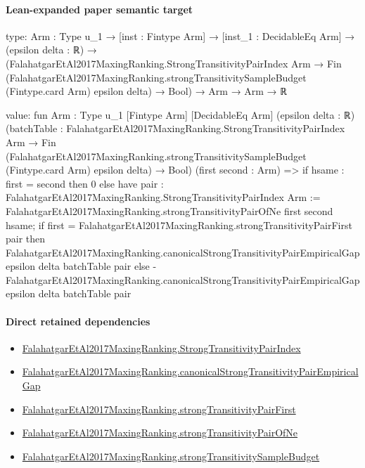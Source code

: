 \documentclass[10pt]{article}
\begin{document}
\paragraph{Lean-expanded paper semantic target}
\begin{ReviewVerbatim}
type:
{Arm : Type u_1} →
  [inst : Fintype Arm] →
    [inst_1 : DecidableEq Arm] →
      (epsilon delta : ℝ) →
        (FalahatgarEtAl2017MaxingRanking.StrongTransitivityPairIndex Arm →
            Fin (FalahatgarEtAl2017MaxingRanking.strongTransitivitySampleBudget (Fintype.card Arm) epsilon delta) →
              Bool) →
          Arm → Arm → ℝ

value:
fun {Arm : Type u_1} [Fintype Arm] [DecidableEq Arm] (epsilon delta : ℝ)
    (batchTable :
      FalahatgarEtAl2017MaxingRanking.StrongTransitivityPairIndex Arm →
        Fin (FalahatgarEtAl2017MaxingRanking.strongTransitivitySampleBudget (Fintype.card Arm) epsilon delta) → Bool)
    (first second : Arm) =>
  if hsame : first = second then 0
  else
    have pair : FalahatgarEtAl2017MaxingRanking.StrongTransitivityPairIndex Arm :=
      FalahatgarEtAl2017MaxingRanking.strongTransitivityPairOfNe first second hsame;
    if first = FalahatgarEtAl2017MaxingRanking.strongTransitivityPairFirst pair then
      FalahatgarEtAl2017MaxingRanking.canonicalStrongTransitivityPairEmpiricalGap epsilon delta batchTable pair
    else -FalahatgarEtAl2017MaxingRanking.canonicalStrongTransitivityPairEmpiricalGap epsilon delta batchTable pair
\end{ReviewVerbatim}

\paragraph{Direct retained dependencies}
\begin{itemize}\raggedright
\item \hyperlink{governing-declaration-5c5e0bb1b8eb067f}{Falahatgar\allowbreak{}Et\allowbreak{}Al2017\allowbreak{}Maxing\allowbreak{}Ranking.\allowbreak{}Strong\allowbreak{}Transitivity\allowbreak{}Pair\allowbreak{}Index}
\item \hyperlink{governing-declaration-ab0b4344c2830a52}{Falahatgar\allowbreak{}Et\allowbreak{}Al2017\allowbreak{}Maxing\allowbreak{}Ranking.\allowbreak{}canonical\allowbreak{}Strong\allowbreak{}Transitivity\allowbreak{}Pair\allowbreak{}Empirical\allowbreak{}Gap}
\item \hyperlink{governing-declaration-05ef765ff7cd25d2}{Falahatgar\allowbreak{}Et\allowbreak{}Al2017\allowbreak{}Maxing\allowbreak{}Ranking.\allowbreak{}strong\allowbreak{}Transitivity\allowbreak{}Pair\allowbreak{}First}
\item \hyperlink{governing-declaration-41b726f0b3c46a7c}{Falahatgar\allowbreak{}Et\allowbreak{}Al2017\allowbreak{}Maxing\allowbreak{}Ranking.\allowbreak{}strong\allowbreak{}Transitivity\allowbreak{}Pair\allowbreak{}Of\allowbreak{}Ne}
\item \hyperlink{governing-declaration-4a0497dd706e9518}{Falahatgar\allowbreak{}Et\allowbreak{}Al2017\allowbreak{}Maxing\allowbreak{}Ranking.\allowbreak{}strong\allowbreak{}Transitivity\allowbreak{}Sample\allowbreak{}Budget}
\end{itemize}
\end{document}
